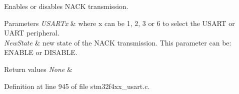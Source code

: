 Enables or disables N\+A\+CK transmission. 


\begin{DoxyParams}{Parameters}
{\em U\+S\+A\+R\+Tx} & where x can be 1, 2, 3 or 6 to select the U\+S\+A\+RT or U\+A\+RT peripheral. \\
\hline
{\em New\+State} & new state of the N\+A\+CK transmission. This parameter can be\+: E\+N\+A\+B\+LE or D\+I\+S\+A\+B\+LE. \\
\hline
\end{DoxyParams}

\begin{DoxyRetVals}{Return values}
{\em None} & \\
\hline
\end{DoxyRetVals}


Definition at line 945 of file stm32f4xx\+\_\+usart.\+c.

